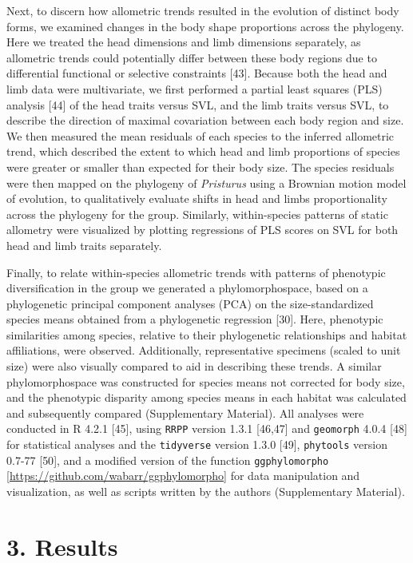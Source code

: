 \documentclass[
  11pt,
]{article}
\begin{document}
Next, to discern how allometric trends resulted in the evolution of
distinct body forms, we examined changes in the body shape proportions
across the phylogeny. Here we treated the head dimensions and limb
dimensions separately, as allometric trends could potentially differ
between these body regions due to differential functional or selective
constraints {[}43{]}. Because both the head and limb data were
multivariate, we first performed a partial least squares (PLS) analysis
{[}44{]} of the head traits versus SVL, and the limb traits versus SVL,
to describe the direction of maximal covariation between each body
region and size. We then measured the mean residuals of each species to
the inferred allometric trend, which described the extent to which head
and limb proportions of species were greater or smaller than expected
for their body size. The species residuals were then mapped on the
phylogeny of \emph{Pristurus} using a Brownian motion model of
evolution, to qualitatively evaluate shifts in head and limbs
proportionality across the phylogeny for the group. Similarly,
within-species patterns of static allometry were visualized by plotting
regressions of PLS scores on SVL for both head and limb traits
separately. \hfill\break

Finally, to relate within-species allometric trends with patterns of
phenotypic diversification in the group we generated a phylomorphospace,
based on a phylogenetic principal component analyses (PCA) on the
size-standardized species means obtained from a phylogenetic regression
{[}30{]}. Here, phenotypic similarities among species, relative to their
phylogenetic relationships and habitat affiliations, were observed.
Additionally, representative specimens (scaled to unit size) were also
visually compared to aid in describing these trends. A similar
phylomorphospace was constructed for species means not corrected for
body size, and the phenotypic disparity among species means in each
habitat was calculated and subsequently compared (Supplementary
Material). All analyses were conducted in R 4.2.1 {[}45{]}, using
\texttt{RRPP} version 1.3.1 {[}46,47{]} and \texttt{geomorph} 4.0.4
{[}48{]} for statistical analyses and the \texttt{tidyverse} version
1.3.0 {[}49{]}, \texttt{phytools} version 0.7-77 {[}50{]}, and a
modified version of the function \texttt{ggphylomorpho}
{[}\url{https://github.com/wabarr/ggphylomorpho}{]} for data
manipulation and visualization, as well as scripts written by the
authors (Supplementary Material).

\hypertarget{results}{%
\section{3. Results}\label{results}}
\end{document}

